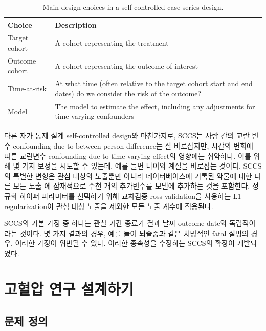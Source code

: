 \documentclass[10.5pt]{book}
\theoremstyle{definition}
\theoremstyle{definition}
\theoremstyle{definition}
\theoremstyle{remark}
\begin{document}
\begin{table}[t]

\caption{\label{tab:sccsChoices}Main design choices in a self-controlled case series design.}
\centering
\begin{tabu} to 
\toprule
Choice & Description\\
\midrule
Target cohort & A cohort representing the treatment\\
Outcome cohort & A cohort representing the outcome of interest\\
Time-at-risk & At what time (often relative to the target cohort start and end dates) do we consider the risk of the outcome?\\
Model & The model to estimate the effect, including any adjustments for time-varying confounders\\
\bottomrule
\end{tabu}
\end{table}

다른 자가 통제 설계 self-controlled design와 마찬가지로, SCCS는 사람
간의 교란 변수 confounding due to between-person difference는 잘
바로잡지만, 시간의 변화에 따른 교란변수 confounding due to time-varying
effect의 영향에는 취약하다. 이를 위해 몇 가지 보정을 시도할 수 있는데,
예를 들면 나이와 계절을 바로잡는 것이다. SCCS의 특별한 변형은 관심
대상의 노출뿐만 아니라 데이터베이스에 기록된 약물에 대한 다른 모든 노출
\citep{simpson_2013} 에 잠재적으로 수천 개의 추가변수를 모델에 추가하는
것을 포함한다. 정규화 하이퍼-파라미터를 선택하기 위해 교차검증
ross-validation을 사용하는 L1-regularization이 관심 대상 노출을 제외한
모든 노출 계수에 적용된다.

SCCS의 기본 가정 중 하나는 관찰 기간 종료가 결과 날짜 outcome date와
독립적이라는 것이다. 몇 가지 결과의 경우, 예를 들어 뇌졸중과 같은
치명적인 fatal 질병의 경우, 이러한 가정이 위반될 수 있다. 이러한
종속성을 수정하는 SCCS의 확장이 개발되었다. \citep{farrington_2011}

\section{고혈압 연구 설계하기}\label{--}

\subsection{문제 정의}\label{--1}
\end{document}
